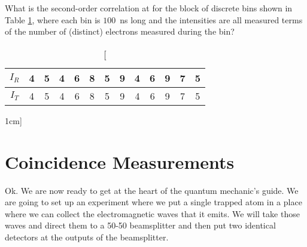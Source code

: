 \begin{exercise}
What is the second-order correlation at for the block of discrete bins shown in Table \ref{tab:normaltab}, where each bin is $100$~ns long and the intensities are all measured terms of the number of (distinct) electrons measured during the bin?
\begin{table}
\centering
\begin{tabular}{|c||c|c|c|c|c|c|c|c|c|c|c|c|}
\hline
$I_R$ & 4 & 5 & 4 & 6 & 8 & 5 & 9 & 4 & 6 & 9 & 7 & 5 \\ 
\hline
$I_T$ & 4 & 5 & 4 & 6 & 8 & 5 & 9 & 4 & 6 & 9 & 7 & 5\\
\hline
\end{tabular}
\caption[][1cm]{ }
\label{tab:normaltab}
\end{table}

\end{exercise}

\section{Coincidence Measurements}
\label{sec:coincid}
Ok. We are now ready to get at the heart of the quantum mechanic's guide. We are going to set up an experiment where we put a single trapped atom in a place where we can collect the electromagnetic waves that it emits. We will take those waves and direct them to a 50-50 beamsplitter and then put two identical detectors at the outputs of the beamsplitter.

\begin{figure}
\centering
{}
\end{figure}


